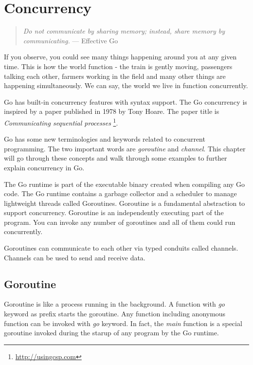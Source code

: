 \cleardoublepage
{}
\chapter{Concurrency}

\begin{quote}
\textit{Do not communicate by sharing memory; instead, share memory by communicating.}  --- Effective Go
\end{quote}

If you observe, you could see many things happening around you at any
given time.  This is how the world function - the train is gently
moving, passengers talking each other, farmers working in the field
and many other things are happening simultaneously.  We can say, the
world we live in function concurrently.

Go has built-in concurrency features with syntax support.  The Go
concurrency is inspired by a paper published in 1978 by Tony Hoare.
The paper title is \textit{Communicating sequential
processes} \footnote{\url{http://usingcsp.com}}.

Go has some new terminologies and keywords related to concurrent
programming.  The two important words are \textit{goroutine}
and \textit{channel}. This chapter will go through these concepts and
walk through some examples to further explain concurrency in Go.

The Go runtime is part of the executable binary created when compiling
any Go code.  The Go runtime contains a garbage collector and a
scheduler to manage lightweight threads called Goroutines.  Goroutine
is a fundamental abstraction to support concurrency.  Goroutine is an
independently executing part of the program.  You can invoke any
number of goroutines and all of them could run concurrently.

Goroutines can communicate to each other via typed conduits called
channels.  Channels can be used to send and receive data.

\section{Goroutine}

Goroutine is like a process running in the
background.  A function with \textit{go} keyword as prefix starts the
goroutine.  Any function including anonymous function can be invoked
with \textit{go} keyword.  In fact, the \textit{main} function is a
special goroutine invoked during the starup of any program by the Go
runtime.


